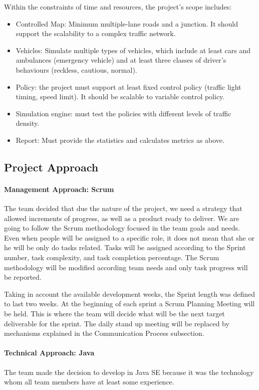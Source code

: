\documentclass[11pt]{article}
\begin{document}
Within the constraints of time and resources, the project’s scope includes:
\begin{itemize}
\item Controlled Map: Minimum multiple-lane roads and a junction. It should support the scalability to a complex traffic network.
\item Vehicles: Simulate multiple types of vehicles, which include at least cars and ambulances (emergency vehicle) and at least three classes of driver’s behaviours (reckless, cautious, normal).
\item Policy: the project must support at least fixed control policy (traffic light timing, speed limit). It should be scalable to variable control policy.
\item Simulation engine: must test the policies with different levels of traffic density.
\item Report: Must provide the statistics and calculates metrics as above.
\end{itemize}


\subsection{Project Approach}
	\paragraph{Management Approach: Scrum} The team decided that due the nature of the project, we need a strategy that allowed increments of progress, as well as a product ready to deliver. We are going to follow the Scrum methodology focused in the team goals and needs. Even when people will be assigned to a specific role, it does not mean that she or he will be only do tasks related. Tasks will be assigned according to the Sprint number, task complexity, and task completion percentage. The Scrum methodology will be modified according team needs and only task progress will be reported.
	
	Taking in account the available development weeks, the Sprint length was defined to last two weeks. At the beginning of each sprint a Scrum Planning Meeting will be held. This is where the team will decide what will be the next target deliverable for the sprint. The daily stand up meeting will be replaced by mechanisms explained in the Communication Process subsection.
	
	\paragraph{Technical Approach: Java} The team made the decision to develop in Java SE because it was the technology whom all team members have at least some experience. 
	
\end{document}
